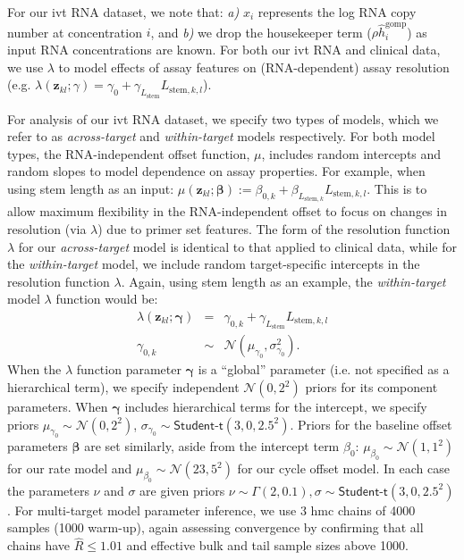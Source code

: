 \documentclass[../thesis.tex]{subfiles}
\begin{document}
For our \gls{ivt} RNA dataset, we note that: \emph{a)} $x_{i}$ represents the log RNA copy number at concentration $i$, and \emph{b)} we drop the housekeeper term ($\rho\hat{h}^{\text{gomp}}_{i}$) as input RNA concentrations are known. For both our \gls{ivt}  RNA and clinical data, we use $\lambda$ to model effects of assay features on (RNA-dependent) assay resolution (e.g. $\lambda(\bm{z}_{kl}; \gamma) = \gamma_{0} + \gamma_{L_{\text{stem}}} L_{\text{stem},k,l}$).

For analysis of our \gls{ivt} RNA dataset, we specify two types of models, which we refer to as \emph{across-target} and \emph{within-target} models respectively. 
For both model types, the RNA-independent offset function, $\mu$, includes random intercepts and random slopes to model dependence on assay properties. For example, when using stem length as an input: $\mu(\bm{z}_{kl}; \bm{\beta}) := \beta_{0,k} + \beta_{L_{\text{stem},k}} L_{\text{stem},k,l}$. This is to allow maximum flexibility in the RNA-independent offset to focus on changes in resolution (via $\lambda$) due to primer set features.
The form of the resolution function $\lambda$ for our \emph{across-target} model is identical to that applied to clinical data, while for the \emph{within-target} model, we include random target-specific intercepts in the resolution function $\lambda$. Again, using stem length as an example, the \emph{within-target} model $\lambda$ function would be:
\begin{eqnarray}
\lambda(\bm{z}_{kl}; \bm{\gamma}) &=& \gamma_{0,k} + \gamma_{L_{\text{stem}}} L_{\text{stem},k,l} \\
\gamma_{0,k} &\sim&  \mathcal{N}(\mu_{\gamma_{0}}, \sigma^{2}_{\gamma_{0}}).    
\end{eqnarray}
When the $\lambda$ function parameter $\bm{\gamma}$ is a ``global'' parameter (i.e. not specified as a hierarchical term), we specify independent $\mathcal{N}(0,2^2)$ priors for its component parameters. When $\bm{\gamma}$ includes hierarchical terms for the intercept, we specify priors $\mu_{\gamma_{0}} \sim \mathcal{N}(0, 2^2)$, $\sigma_{\gamma_{0}} \sim \textsf{Student-t}(3, 0, 2.5^2)$. Priors for the baseline offset parameters $\bm{\beta}$ are set similarly, aside from the intercept term $\beta_0$: $\mu_{\beta_0} \sim \mathcal{N}(1, 1^2)$ for our rate model and $\mu_{\beta_0} \sim \mathcal{N}(23, 5^2)$ for our cycle offset model. In each case the parameters $\nu$ and $\sigma$ are given priors $\nu \sim \Gamma (2, 0.1), \sigma \sim \textsf{Student-t}(3, 0, 2.5^2)$.
For multi-target model parameter inference, we use 3 \gls{hmc} chains of 4000 samples (1000 warm-up), again assessing convergence by confirming that all chains have $\hat{R} \leq 1.01$ and effective bulk and tail sample sizes above 1000.
\end{document}
